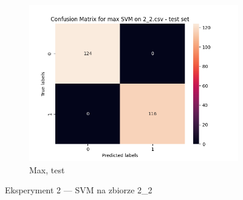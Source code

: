 \documentclass[12pt]{article}
\newcommand*{\subfigwidth}{0.24\textwidth}
\begin{document}
\begin{figure}[H]
\begin{subfigure}[t]{\subfigwidth}
        \includegraphics[width=\linewidth]{img/exp_2/svm/2_2/max/test_matrix.png}
        \caption{Max, test}
    \end{subfigure} 
    
    \caption{Eksperyment 2 --- SVM na zbiorze 2\_2}\label{fig:figure14}
\end{figure}
\end{document}
